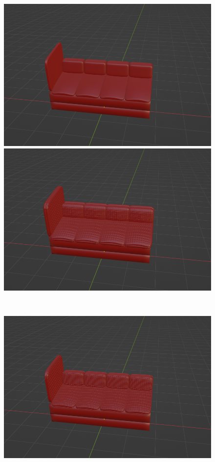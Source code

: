 \begin{figure}[h]
\begin{minipage}[b]{0.48\linewidth}
  \includegraphics[scale=0.17]{./imgs/sofaParamMean/stichingMin.png}
 \end{minipage}
 \begin{minipage}[b]{0.48\linewidth}
  \centering
  \includegraphics[scale=0.17]{./imgs/sofaParamMean/stichingMax.png}
 \end{minipage}\\
  \begin{minipage}[b]{0.48\linewidth}
  \centering
  \includegraphics[scale=0.17]{./imgs/sofaParamMean/creaseMin.png}

\end{minipage}
\end{figure}

